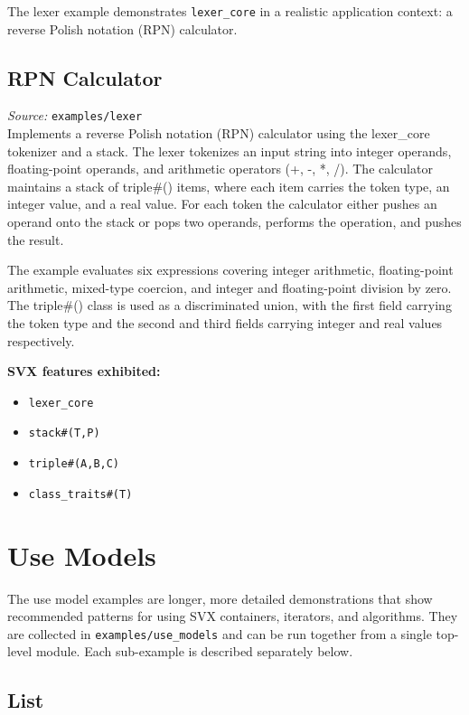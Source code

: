 \documentclass[11pt,letterpaper]{report}
\begin{document}
The lexer example demonstrates \texttt{lexer\_core} in a realistic application context: a reverse Polish notation (RPN) calculator.

\section{RPN Calculator}

\textit{Source:} \texttt{examples/lexer}\\

Implements a reverse Polish notation (RPN) calculator using the lexer\_core tokenizer and a stack. The lexer tokenizes an input string into integer operands, floating-point operands, and arithmetic operators (+, -, *, /). The calculator maintains a stack of triple\#() items, where each item carries the token type, an integer value, and a real value. For each token the calculator either pushes an operand onto the stack or pops two operands, performs the operation, and pushes the result.

The example evaluates six expressions covering integer arithmetic, floating-point arithmetic, mixed-type coercion, and integer and floating-point division by zero. The triple\#() class is used as a discriminated union, with the first field carrying the token type and the second and third fields carrying integer and real values respectively.

\textbf{SVX features exhibited:}

\begin{itemize}
  \item \texttt{lexer\_core}
  \item \texttt{stack\#(T,P)}
  \item \texttt{triple\#(A,B,C)}
  \item \texttt{class\_traits\#(T)}
\end{itemize}
\chapter{Use Models}

The use model examples are longer, more detailed demonstrations that show recommended patterns for using SVX containers, iterators, and algorithms. They are collected in \texttt{examples/use\_models} and can be run together from a single top-level module. Each sub-example is described separately below.

\section{List}
\end{document}
